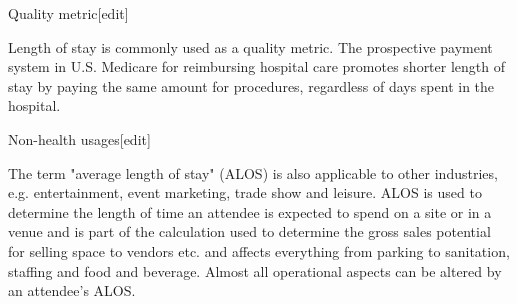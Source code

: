 Quality metric[edit]
 
Length of stay is commonly used as a quality metric. The prospective payment system in U.S. Medicare for reimbursing hospital care promotes shorter length of stay by paying the same amount for procedures, regardless of days spent in the hospital.
 
Non-health usages[edit]
 
The term "average length of stay" (ALOS) is also applicable to other industries, e.g. entertainment, event marketing, trade show and leisure. ALOS is used to determine the length of time an attendee is expected to spend on a site or in a venue and is part of the calculation used to determine the gross sales potential for selling space to vendors etc. and affects everything from parking to sanitation, staffing and food and beverage. Almost all operational aspects can be altered by an attendee's ALOS.


